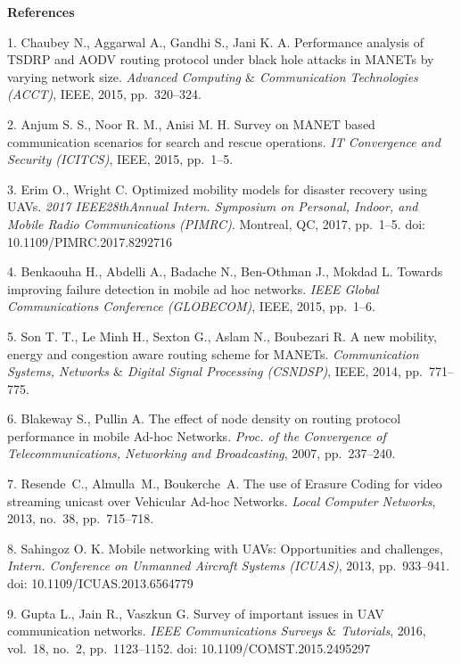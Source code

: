 
{\small

\vskip6mm

\noindent \textbf{References} }

\vskip 2mm

{\footnotesize

1. Chaubey N., Aggarwal A., Gandhi S., Jani K. A.  Performance
analysis of TSDRP and AODV routing protocol under black hole
attacks in MANETs by varying network size. {\it Advanced Computing
$\&$  Communication Technologies (ACCT)},  IEEE, 2015,
pp.~320--324.

2. Anjum S. S., Noor R. M., Anisi M. H. Survey on MANET based
communication scenarios for search and rescue operations. {\it IT
Convergence and Security (ICITCS)},  IEEE,  2015, pp.~1--5.

3. Erim O., Wright C. Optimized mobility models for disaster
recovery using UAVs. {\it 2017 IEEE\linebreak 28th\-An\-nual
Intern. Symposium on Personal, Indoor, and Mobile Radio
Communications (PIMRC)}. Montreal, QC, 2017, pp.~1--5. doi:
10.1109/PIMRC.2017.8292716

4. Benkaouha H., Abdelli A., Badache N., Ben-Othman J., Mokdad L.
Towards improving failure detection in mobile ad hoc networks.
{\it IEEE Global Communications Conference (GLOBECOM)}, IEEE,
2015, pp.~1--6.

5. Son T. T., Le Minh H., Sexton G., Aslam N., Boubezari R. A new
mobility, energy and congestion aware routing scheme for MANETs.
{\em Communication Systems, Networks $\&$  Digital Signal
Processing (CSNDSP)}, IEEE, 2014, pp.~771--775.

6. Blakeway S., Pullin A. The effect of node density on routing
protocol performance in mobile Ad-hoc Networks.  {\em Proc. of the
Convergence of Telecommunications, Networking and Broadcasting},
2007,  pp.~237--240.

7. Resende~C., Almulla~M., Boukerche~A. The use of Erasure Coding
for video streaming unicast over Vehicular Ad-hoc Networks. {\em
Local Computer Networks}, 2013, no.~38, pp.~715--718.

8. Sahingoz O. K. Mobile networking with UAVs: Opportunities and
challenges, {\em Intern. Conference on Unmanned Aircraft Systems
(ICUAS)}, 2013, pp.~933--941. doi: 10.1109/ICUAS.2013.6564779

9. Gupta L., Jain R., Vaszkun G. Survey of important issues in UAV
communication networks. {\em IEEE Communications Surveys $\&$
Tutorials}, 2016, vol.~18, no.~2, pp.~1123--1152. doi:
10.1109/COMST.2015.2495297

}
